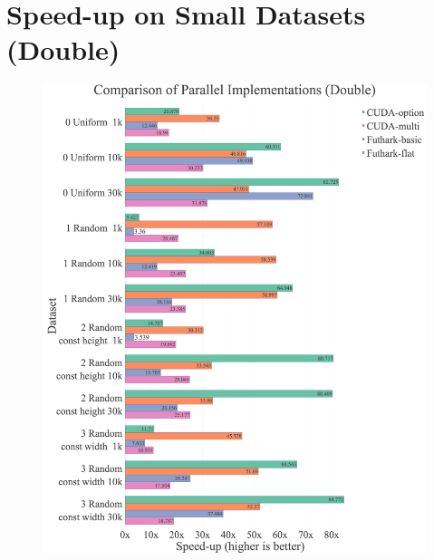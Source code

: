 \section{Speed-up on Small Datasets (Double)}
\begin{figure}[H]
\begin{adjustwidth}{-2cm}{-2cm}
	\centering
    \includegraphics[width=1\textwidth]{img/experiments/small-all-approaches-double.png}
\end{adjustwidth}
\end{figure}